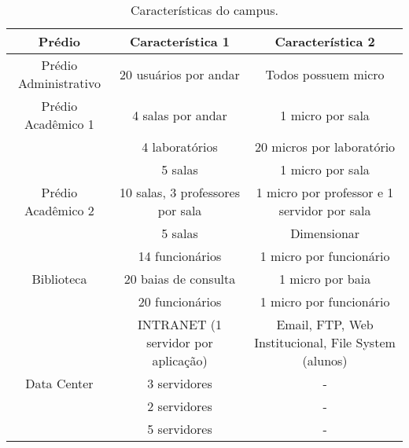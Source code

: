 \begin{table}[H]
\centering
\begin{tabular}{ccc}
\toprule
Prédio                  & Característica 1                                    & Característica 2                           \\
\midrule
Prédio Administrativo  & 20 usuários por andar                              & Todos possuem micro                       \\
Prédio Acadêmico 1     & 4 salas por andar                                  & 1 micro por sala                          \\
                       & 4 laboratórios                                     & 20 micros por laboratório                 \\
                       & 5 salas                                            & 1 micro por sala                          \\
Prédio Acadêmico 2     & 10 salas, 3 professores por sala                   & 1 micro por professor e 1 servidor por sala\\
                          & 5 salas                                            & Dimensionar                               \\
                          & 14 funcionários                                    & 1 micro por funcionário                   \\
Biblioteca             & 20 baias de consulta                               & 1 micro por baia                          \\
                            & 20 funcionários                                    & 1 micro por funcionário                   \\
                            & INTRANET (1 servidor por aplicação)                & Email, FTP, Web Institucional, File System (alunos)\\
Data Center            & 3 servidores & -                                    \\
                            & 2 servidores & -                                    \\
                            & 5 servidores & -                                    \\
\bottomrule
\end{tabular}
\caption{Características do campus.}
\label{tab:caracteristicas}
\end{table}

